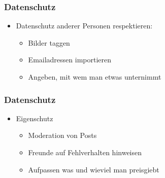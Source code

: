 \documentclass[12pt]{beamer}
\begin{document}
\begin{frame}
  \frametitle{Datenschutz}

  \begin{itemize}
    \item Datenschutz anderer Personen respektieren:
      \begin{itemize}
        \item<2->Bilder taggen
        \item<3->Emailadressen importieren
        \item<4->Angeben, mit wem man etwas unternimmt
      \end{itemize}
  \end{itemize}
\end{frame}

\begin{frame}
  \frametitle{Datenschutz}

  \begin{itemize}
    \item Eigenschutz
      \begin{itemize}
        \item<2->Moderation von Posts
        \item<3->Freunde auf Fehlverhalten hinweisen
        \item<4->Aufpassen was und wieviel man preisgiebt
      \end{itemize}
  \end{itemize}
\end{frame}
\end{document}
